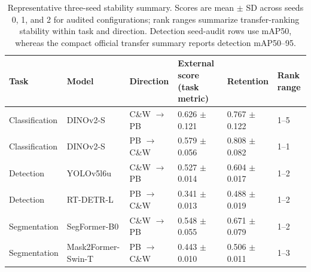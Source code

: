 \begin{table}[!htbp]
\centering
\footnotesize
\setlength{\tabcolsep}{3pt}
\renewcommand{\arraystretch}{1.17}
\caption{Representative three-seed stability summary. Scores are mean $\pm$ SD across seeds 0, 1, and 2 for audited configurations; rank ranges summarize transfer-ranking stability within task and direction. Detection seed-audit rows use mAP50, whereas the compact official transfer summary reports detection mAP50--95.}
\label{tab:multiseed}
\begin{tabularx}{\textwidth}{@{}P{0.135\textwidth}P{0.225\textwidth}C{0.145\textwidth}C{0.135\textwidth}C{0.130\textwidth}C{0.085\textwidth}@{}}
\toprule
Task & Model & Direction & External score (task metric) & Retention & Rank range \\
\midrule
Classification & DINOv2-S & C\&W $\rightarrow$ PB & 0.626 $\pm$ 0.121 & 0.767 $\pm$ 0.122 & 1--5 \\
Classification & DINOv2-S & PB $\rightarrow$ C\&W & 0.579 $\pm$ 0.056 & 0.808 $\pm$ 0.082 & 1--1 \\
Detection & YOLOv5l6u & C\&W $\rightarrow$ PB & 0.527 $\pm$ 0.014 & 0.604 $\pm$ 0.017 & 1--2 \\
Detection & RT-DETR-L & PB $\rightarrow$ C\&W & 0.341 $\pm$ 0.013 & 0.488 $\pm$ 0.019 & 1--2 \\
Segmentation & SegFormer-B0 & C\&W $\rightarrow$ PB & 0.548 $\pm$ 0.055 & 0.671 $\pm$ 0.079 & 1--2 \\
Segmentation & \mbox{Mask2Former-Swin-T} & PB $\rightarrow$ C\&W & 0.443 $\pm$ 0.010 & 0.506 $\pm$ 0.011 & 1--3 \\
\bottomrule
\end{tabularx}
\end{table}
